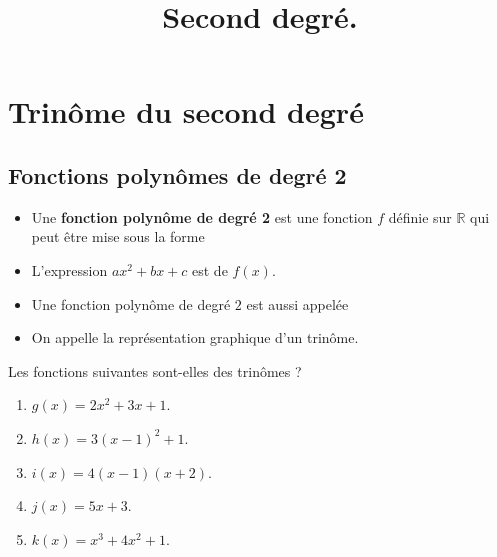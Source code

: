 \documentclass{beamer}
\date{}
\title{Second degré.}
\begin{document}
  
  \begin{frame}
    
    \titlepage
    
  \end{frame}
  
  
    
  \section{Trinôme du second degré}
  \subsection{Fonctions polynômes de degré 2}
  \begin{frame} 
    
  \begin{definition}
    \begin{itemize}
     \item Une \textbf{fonction polynôme de degré 2} est une fonction 
     $f$ définie sur $\mathbb{R}$ qui peut être mise sous la forme 
      
     
   \item L'expression $ax^2+bx+c$ est  de $f(x)$.
     \item Une fonction polynôme de degré $2$ est aussi appelée 
     \item On appelle  la représentation graphique 
     d'un trinôme.
   \end{itemize}    
  \end{definition}
  
  \end{frame}
  
  \begin{frame}
    \begin{example}
    Les fonctions suivantes sont-elles des trinômes ?
    \begin{enumerate}
     \item $g(x)=2x^2+3x+1$. 
     \item $h(x)=3(x-1)^2+1$.
     \item $i(x)=4(x-1)(x+2)$.
     \item $j(x)=5x+3$.
     \item $k(x)=x^3+4x^2+1$.
     \end{enumerate}
  \end{example}
  \end{frame}
  
\end{document}
